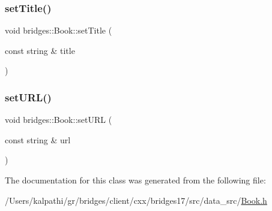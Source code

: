 \mbox{\label{classbridges_1_1_book_a68e4e04db8915b6baff809c46e6d1df9}} 
\subsubsection{\texorpdfstring{set\+Title()}{setTitle()}}
{\footnotesize\ttfamily void bridges\+::\+Book\+::set\+Title (\begin{DoxyParamCaption}\item[{const string \&}]{title }\end{DoxyParamCaption})\hspace{0.3cm}{\ttfamily [inline]}}

\mbox{\label{classbridges_1_1_book_a48d590f296837b8eb9ac10451c83d23b}} 
\subsubsection{\texorpdfstring{set\+U\+R\+L()}{setURL()}}
{\footnotesize\ttfamily void bridges\+::\+Book\+::set\+U\+RL (\begin{DoxyParamCaption}\item[{const string \&}]{url }\end{DoxyParamCaption})\hspace{0.3cm}{\ttfamily [inline]}}



The documentation for this class was generated from the following file\+:\begin{DoxyCompactItemize}
\item 
/\+Users/kalpathi/gr/bridges/client/cxx/bridges17/src/data\+\_\+src/\mbox{\hyperlink{_book_8h}{Book.\+h}}\end{DoxyCompactItemize}
